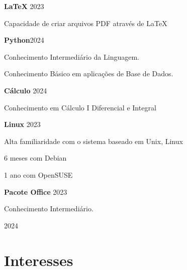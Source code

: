 \documentclass{article}
\newcommand{\cvsection}[1]{\section*{\rmfamily#1}}
\begin{document}
{\large

\textbf{LaTeX} \hfill 2023

\hspace{2em}Capacidade de criar arquivos PDF através de LaTeX

\textbf{Python}\hfill 2024

\indent
\hspace{2em}Conhecimento Intermediário da Linguagem.

\hspace{2em}Conhecimento Básico em aplicações de Base de Dados.

\textbf{Cálculo} \hfill 2024

\hspace{2em}Conhecimento em Cálculo I Diferencial e Integral

\textbf{Linux} \hfill 2023

\hspace{2em}Alta familiaridade com o sistema baseado em Unix, Linux

\hspace{2em}6 meses com Debian

\hspace{2em}1 ano com OpenSUSE

\textbf{Pacote Office} \hfill 2023

\hspace{2em}Conhecimento Intermediário.

}


\vfill
\begin{center}
    \Large 2024
\end{center}

\newpage
\indent

\cvsection{Interesses}
\indent
\end{document}
